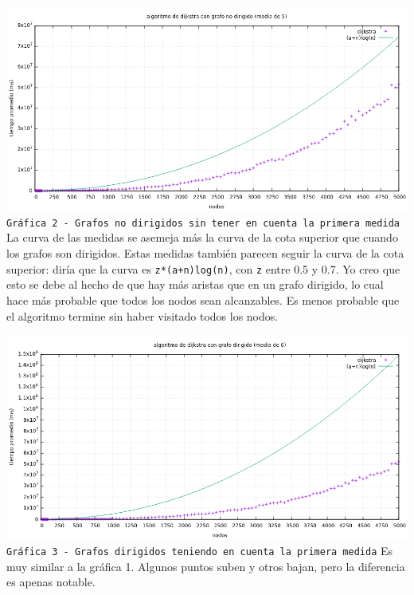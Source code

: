 \documentclass[12pt , a4paper]{article}
\begin{document}
	
	\newpage
	\hspace*{-.15\linewidth}
	\includegraphics[width=1.25\hsize]{nodir5.png}
	\texttt{Gráfica 2 - Grafos no dirigidos sin tener en cuenta la primera medida}
	La curva de las medidas se asemeja más la curva de la cota superior que cuando los grafos son dirigidos. Estas medidas también parecen seguir la curva de la cota superior: diría que la curva es \texttt{z*(a+n)log(n)}, con \texttt{z} entre 0.5 y 0.7.  Yo creo que esto se debe al hecho de que hay más aristas que en un grafo dirigido, lo cual hace más probable que todos los nodos sean alcanzables. Es menos probable que el algoritmo termine sin haber visitado todos los nodos.


	\newpage
	\hspace*{-.15\linewidth}
	\includegraphics[width=1.25\hsize]{dir6.png}
	\texttt{Gráfica 3 - Grafos dirigidos teniendo en cuenta la primera medida}
	Es muy similar a la gráfica 1. Algunos puntos suben y otros bajan, pero la diferencia es apenas notable.
	
\end{document}
